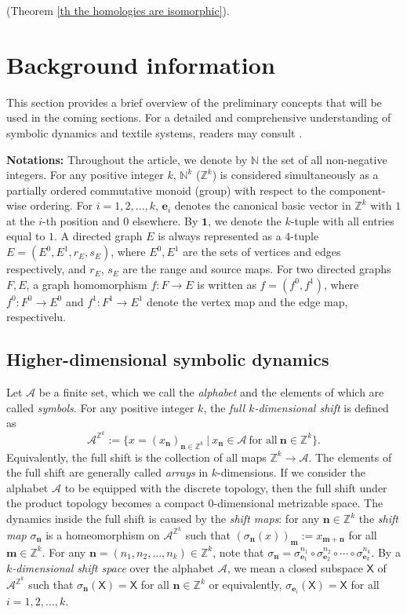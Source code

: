 \documentclass[a4paper,reqno,12pt]{amsart}
\newcommand{\N}{\mathbf{n}}
\newcommand{\M}{\mathbf{m}}
\newcommand{\Xs}{\mathsf{X}}
\theoremstyle{definition}
\theoremstyle{remark}
\begin{document}
(Theorem \ref{th the homologies are isomorphic}).  

\section{Background information}\label{sec preliminaries}
This section provides a brief overview of the preliminary concepts that will be used in the coming sections. For a detailed and comprehensive understanding of symbolic dynamics and textile systems, readers may consult \cite{BGGLPP, Lind-Marcus, Quas-Trow, Tang}. 

\textbf{Notations:} Throughout the article, we denote by $\mathbb{N}$ the set of all non-negative integers. For any positive integer $k$, $\mathbb{N}^k$ ($\mathbb{Z}^k$) is considered simultaneously as a partially ordered commutative monoid (group) with respect to the component-wise ordering. For $i=1,2,\ldots,k$, $\mathbf{e}_i$ denotes the canonical basic vector in $\mathbb{Z}^k$ with $1$ at the $i$-th position and $0$ elsewhere. By $\mathbf{1}$, we denote the $k$-tuple with all entries equal to $1$. A directed graph $E$ is always represented as a $4$-tuple $E=(E^0,E^1,r_E,s_E)$, where $E^0,E^1$ are the sets of vertices and edges respectively, and $r_E$, $s_E$ are the range and source maps. For two directed graphs $F,E$, a graph homomorphism $f:F\longrightarrow E$ is written as $f=(f^0,f^1)$, where $f^0:F^0\longrightarrow E^0$ and $f^1:F^1\longrightarrow E^1$ denote the vertex map and the edge map, respectivelu. 

\subsection{Higher-dimensional symbolic dynamics}\label{ssec symbolic dynamics}
Let $\mathcal{A}$ be a finite set, which we call the \emph{alphabet} and the elements of which are called \emph{symbols}. For any positive integer $k$, the \emph{full $k$-dimensional shift} is defined as \[\mathcal{A}^{\mathbb{Z}^k}:=\{x=(x_\N)_{\N\in \mathbb{Z}^k}~|~x_\N\in \mathcal{A}~\text{for all}~\N\in \mathbb{Z}^k\}.\] Equivalently, the full shift is the collection of all maps $\mathbb{Z}^k\longrightarrow \mathcal{A}$. The elements of the full shift are generally called \emph{arrays} in $k$-dimensions. If we consider the alphabet $\mathcal{A}$ to be equipped with the discrete topology, then the full shift under the product topology becomes a compact $0$-dimensional metrizable space. The dynamics inside the full shift is caused by the \emph{shift maps}: for any $\N\in \mathbb{Z}^k$ the \emph{shift map} $\sigma_\N$ is a homeomorphism on $\mathcal{A}^{\mathbb{Z}^k}$ such that $(\sigma_\N(x))_\M:=x_{\M+\N}$ for all $\M\in \mathbb{Z}^k$. For any $\N=(n_1,n_2,\ldots,n_k)\in \mathbb{Z}^k$, note that $\sigma_\N=\sigma_{\mathbf{e}_1}^{n_1}\circ \sigma_{\mathbf{e}_2}^{n_2}\circ \cdots \circ \sigma_{\mathbf{e}_k}^{n_k}$. By a \emph{$k$-dimensional shift space} over the alphabet $\mathcal{A}$, we mean a closed subspace $\mathsf{X}$ of $\mathcal{A}^{\mathbb{Z}^k}$ such that $\sigma_\N(\mathsf{X})=\mathsf{X}$ for all $\N\in \mathbb{Z}^k$ or equivalently, $\sigma_{\mathbf{e}_i}(\Xs)=\Xs$ for all $i=1,2,\ldots,k$. 
\end{document}
